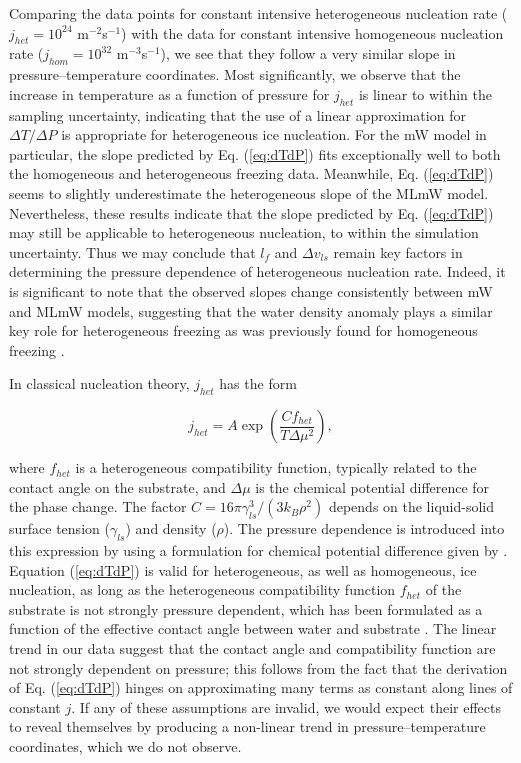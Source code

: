 \documentclass[journal abbreviation, manuscript]{copernicus}
\begin{document}
Comparing the data points for constant intensive heterogeneous nucleation rate ($j_{het} = 10^{24}$ m$^{-2}$s$^{-1}$) with the data for constant intensive homogeneous nucleation rate ($j_{hom} = 10^{32}$ m$^{-3}$s$^{-1}$), we see that they follow a very similar slope in pressure--temperature coordinates. Most significantly, we observe that the increase in temperature as a function of pressure for $j_{het}$ is linear to within the sampling uncertainty, indicating that the use of a linear approximation for $\Delta T/\Delta P$ is appropriate for heterogeneous ice nucleation. For the mW model in particular, the slope predicted by Eq. (\ref{eq:dTdP}) fits exceptionally well to both the homogeneous and heterogeneous freezing data. Meanwhile, Eq. (\ref{eq:dTdP}) seems to slightly underestimate the heterogeneous slope of the MLmW model. Nevertheless, these results indicate that the slope predicted by Eq. (\ref{eq:dTdP}) may still be applicable to heterogeneous nucleation, to within the simulation uncertainty. Thus we may conclude that $l_f$ and $\Delta v_{ls}$ remain key factors in determining the pressure dependence of heterogeneous nucleation rate. Indeed, it is significant to note that the observed slopes change consistently between mW and MLmW models, suggesting that the water density anomaly plays a similar key role for heterogeneous freezing as was previously found for homogeneous freezing \citep{rosky2022}. 

In classical nucleation theory, $j_{het}$ has the form

\begin{equation} \label{eq:R}
    j_{het} = A \exp \! \left(\frac{C f_{het}}{T\Delta \mu ^2} \right),
\end{equation}

\noindent where $f_{het}$ is a heterogeneous compatibility function, typically related to the contact angle on the substrate, and $\Delta \mu$ is the chemical potential difference for the phase change. The factor $C = 16 \pi \gamma_{ls}^3 / (3 k_B \rho^2)$ depends on the liquid-solid surface tension ($\gamma_{ls}$) and density ($\rho$). The pressure dependence is introduced into this expression by using a formulation for chemical potential difference given by \citet{nemec2013}.
Equation (\ref{eq:dTdP}) is valid for heterogeneous, as well as homogeneous, ice nucleation, as long as the heterogeneous compatibility function $f_{het}$ of the substrate is not strongly pressure dependent, which has been formulated as a function of the effective contact angle between water and substrate \citep{lamb2011physics, zobrist2007}. The linear trend in our data suggest that the contact angle and compatibility function are not strongly dependent on pressure; this follows from the fact that the derivation of Eq. (\ref{eq:dTdP}) hinges on approximating many terms as constant along lines of constant $j$. If any of these assumptions are invalid, we would expect their effects to reveal themselves by producing a non-linear trend in pressure--temperature coordinates, which we do not observe.  
\end{document}
